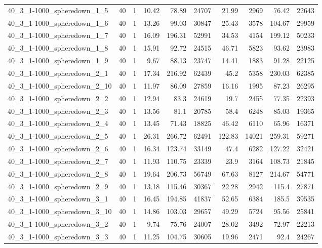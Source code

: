 \begin{center}
\begin{scriptsize}
\begin{longtable}{lrrrrrrrrr}
40\_3\_1-1000\_spheredown\_1\_5 & 40 & 1 & 10.42 & 78.89 & 24707 & 21.99 & 2969 & 76.42 & 22643\\
40\_3\_1-1000\_spheredown\_1\_6 & 40 & 1 & 13.26 & 99.03 & 30847 & 25.43 & 3578 & 104.67 & 29959\\
40\_3\_1-1000\_spheredown\_1\_7 & 40 & 1 & 16.09 & 196.31 & 52991 & 34.53 & 4154 & 199.12 & 50233\\
40\_3\_1-1000\_spheredown\_1\_8 & 40 & 1 & 15.91 & 92.72 & 24515 & 46.71 & 5823 & 93.62 & 23983\\
40\_3\_1-1000\_spheredown\_1\_9 & 40 & 1 & 9.67 & 88.13 & 23747 & 14.41 & 1883 & 91.28 & 22125\\
40\_3\_1-1000\_spheredown\_2\_1 & 40 & 1 & 17.34 & 216.92 & 62439 & 45.2 & 5358 & 230.03 & 62385\\
40\_3\_1-1000\_spheredown\_2\_10 & 40 & 1 & 11.97 & 86.09 & 27859 & 16.16 & 1995 & 87.23 & 26295\\
40\_3\_1-1000\_spheredown\_2\_2 & 40 & 1 & 12.94 & 83.3 & 24619 & 19.7 & 2455 & 77.35 & 22393\\
40\_3\_1-1000\_spheredown\_2\_3 & 40 & 1 & 13.56 & 81.1 & 20785 & 58.4 & 6248 & 85.03 & 19365\\
40\_3\_1-1000\_spheredown\_2\_4 & 40 & 1 & 13.45 & 71.43 & 18825 & 46.42 & 6110 & 65.96 & 16371\\
40\_3\_1-1000\_spheredown\_2\_5 & 40 & 1 & 26.31 & 266.72 & 62491 & 122.83 & 14021 & 259.31 & 59271\\
40\_3\_1-1000\_spheredown\_2\_6 & 40 & 1 & 16.34 & 123.74 & 33149 & 47.4 & 6282 & 127.22 & 32421\\
40\_3\_1-1000\_spheredown\_2\_7 & 40 & 1 & 11.93 & 110.75 & 23339 & 23.9 & 3164 & 108.73 & 21845\\
40\_3\_1-1000\_spheredown\_2\_8 & 40 & 1 & 19.64 & 206.73 & 56749 & 67.63 & 8127 & 214.67 & 54771\\
40\_3\_1-1000\_spheredown\_2\_9 & 40 & 1 & 13.18 & 115.46 & 30367 & 22.28 & 2942 & 115.4 & 27871\\
40\_3\_1-1000\_spheredown\_3\_1 & 40 & 1 & 16.45 & 194.85 & 41837 & 52.65 & 6384 & 185.5 & 39535\\
40\_3\_1-1000\_spheredown\_3\_10 & 40 & 1 & 14.86 & 103.03 & 29657 & 49.29 & 5724 & 95.56 & 25841\\
40\_3\_1-1000\_spheredown\_3\_2 & 40 & 1 & 9.74 & 75.76 & 24007 & 28.02 & 3492 & 72.97 & 22213\\
40\_3\_1-1000\_spheredown\_3\_3 & 40 & 1 & 11.25 & 104.75 & 30605 & 19.96 & 2471 & 92.4 & 24267\\

\end{longtable}
\end{scriptsize}
\end{center}
